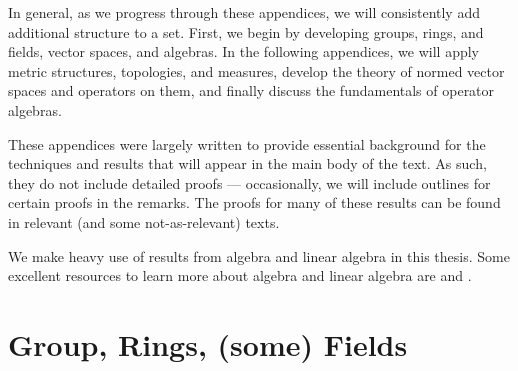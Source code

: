 In general, as we progress through these appendices, we will consistently add additional structure to a set. First, we begin by developing groups, rings, and fields, vector spaces, and algebras. In the following appendices, we will apply metric structures, topologies, and measures, develop the theory of normed vector spaces and operators on them, and finally discuss the fundamentals of operator algebras.\newline

These appendices were largely written to provide essential background for the techniques and results that will appear in the main body of the text. As such, they do not include detailed proofs --- occasionally, we will include outlines for certain proofs in the remarks. The proofs for many of these results can be found in relevant (and some not-as-relevant) texts.\newline

We make heavy use of results from algebra and linear algebra in this thesis. Some excellent resources to learn more about algebra and linear algebra are \cite{dummit_and_foote} and \cite{algebra_chapter_0}.
\section{Group, Rings, (some) Fields}%
